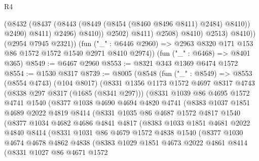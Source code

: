\begin{lexlean}{R4}
\begin{coremodule}
                            (@8432
                              (@8437 (@8443 (@8449 (@8454 (@8460 @8496 @8411) @2484) @8410)) @2490)
                              @8411)
                            @2496)
                          @8410))
                      @2502)
                    @8411)
                  @2508)
                @8410)
              @2513)
            @8410))
        (@2954 @7945 @2321))
      (fun ("_" : @6446 @2960) => @2963 @8320 @171 @153 @86 @1572 @1572 @1540 @2971 @8410 @2974))
    (fun ("_" : @6468) => @8401 @365)
@8549 := @6467 @2960
@8553 := @8321 @343 @1369 @6474 @1572
@8554 := @1530 @8317
@8739 := @8005
    (@8548
      (fun ("_" : @8549) =>
      @8553
        (@8554 @4743)
        (@104 @8017)
        (@8331
          @1356
          @1173
          @1572
          @4697
          @8317
          @4743
          (@8338 @297 @8317 (@1685 (@8341 @297)))
          (@8331
            @1039
            @86
            @4695
            @1572
            @4741
            @1540
            (@8377
              @1038
              @4690
              @4694
              @4820
              @4741
              (@8383
                @1037
                @1851
                @4689
                @2022
                @4819
                @8414
                (@8331
                  @1035
                  @86
                  @4687
                  @1572
                  @4817
                  @1540
                  (@8377
                    @1034
                    @4682
                    @4686
                    @4841
                    @4817
                    (@8383
                      @1033
                      @1851
                      @4681
                      @2022
                      @4840
                      @8414
                      (@8331
                        @1031
                        @86
                        @4679
                        @1572
                        @4838
                        @1540
                        (@8377
                          @1030
                          @4674
                          @4678
                          @4862
                          @4838
                          (@8383
                            @1029
                            @1851
                            @4673
                            @2022
                            @4861
                            @8414
                            (@8331
                              @1027
                              @86
                              @4671
                              @1572

\end{coremodule}
\end{lexlean}
